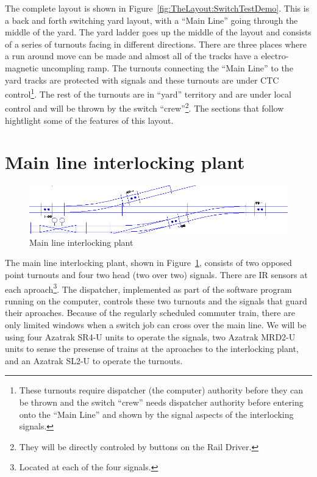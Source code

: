 The complete layout is shown in
Figure~\ref{fig:TheLayout:SwitchTestDemo}. This is a back and forth
switching yard layout, with a ``Main Line'' going through the middle of
the yard.  The yard ladder goes up the middle of the layout and
consists of a series of turnouts facing in different directions. There
are three places where a run around move can be made and almost all of
the tracks have a electro-magnetic uncompling ramp.  The turnouts
connecting the ``Main Line'' to the yard tracks are protected with
signals and these turnouts are under CTC control\footnote{These
turnouts require dispatcher (the computer) authority before they can be
thrown and the switch ``crew'' needs dispatcher authority before
entering onto the ``Main Line'' and shown by the signal aspects of the
interlocking signals.}.  The rest of the turnouts are in ``yard''
territory and are under local control and will be thrown by the switch
``crew''\footnote{They will be directly controled by buttons on the
Rail Driver.}.  The sections that follow hightlight some of the features
of this layout.

\section{Main line interlocking plant}

\begin{figure}[hbpt]
\begin{centering}
\includegraphics[width=5in]{SwitchTestDemo-MainInterlocking.png}
\caption{Main line interlocking plant}
\label{fig:TheLayout:SwitchTestDemo-MainInterlocking}
\end{centering}
\end{figure}
The main line interlocking plant, shown in
Figure~\ref{fig:TheLayout:SwitchTestDemo-MainInterlocking}, consists of
two opposed point turnouts and four two head (two over two) signals.
There are IR sensors at each aproach\footnote{Located at each of the
four signals.}.  The dispatcher, implemented as part of the software
program running on the computer, controls these two turnouts and the
signals that guard their aproaches.  Because of the regularly scheduled
commuter train, there are only limited windows when a switch job can
cross over the main line.  We will be using four Azatrak SR4-U units to
operate the signals, two Azatrak MRD2-U units to sense the presense of
trains at the aproaches to the interlocking plant, and an Azatrak SL2-U
to operate the turnouts.

